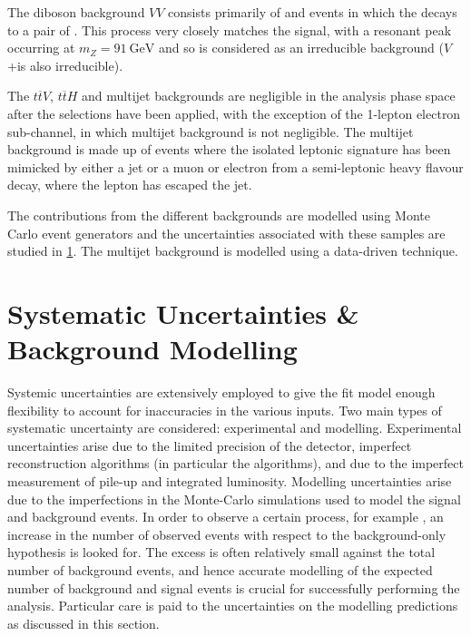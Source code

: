 The diboson background $VV$ consists primarily of \Wboson\Zboson and \Zboson\Zboson events in which the \Zboson decays to a pair of \bquarks.
This process very closely matches the signal, with a resonant peak occurring at $m_Z = \SI{91}{\GeV}$ and so is considered as an 
irreducible background ($V$+\bjets is also irreducible).

The $t\overline{t} V$, $t\overline{t} H$ and multijet backgrounds are negligible in the analysis phase space after the selections have been applied, with the exception of the 1-lepton electron sub-channel, in which multijet background is not negligible.
The multijet background is made up of events where the isolated leptonic signature has been mimicked by either a jet or a muon or electron from a semi-leptonic heavy flavour decay, where the lepton has escaped the jet.

The contributions from the different backgrounds are modelled using Monte Carlo event generators and the uncertainties associated with these samples are studied in \cref{sec:vhbb_modelling}.
The multijet background is modelled using a data-driven technique.


\section{Systematic Uncertainties \& Background Modelling}\label{sec:vhbb_modelling}

Systemic uncertainties are extensively employed to give the fit model enough flexibility to account for inaccuracies in the various inputs.
Two main types of systematic uncertainty are considered: experimental and modelling.
Experimental uncertainties arise due to the limited precision of the detector, imperfect reconstruction algorithms (in particular the \btagging algorithms), and due to the imperfect measurement of pile-up and integrated luminosity.
Modelling uncertainties arise due to the imperfections in the Monte-Carlo simulations used to model the signal and background events.
In order to observe a certain process, for example \VHbb, an increase in the number of observed events with respect to the background-only hypothesis is looked for.
The excess is often relatively small against the total number of background events, and hence accurate modelling of the expected number of background and signal events is crucial for successfully performing the analysis.
Particular care is paid to the uncertainties on the modelling predictions as discussed in this section.

